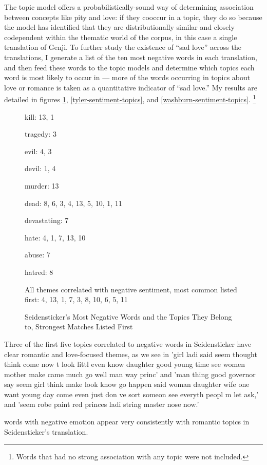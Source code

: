 \documentclass[12pt]{article}
\begin{document}
\begin{flushleft}
\begin{spacing}{2.0}
The topic model offers a probabilistically-sound way of determining association between concepts like pity and love: if they cooccur in a topic, they do so because the model has identified that they are distributionally similar and closely codependent within the thematic world of the corpus, in this case a single translation of Genji. To further study the existence of ``sad love'' across the translations, I generate a list of the ten most negative words in each translation, and then feed these words to the topic models and determine which topics each word is most likely to occur in --- more of the words occurring in topics about love or romance is taken as a quantitative indicator of ``sad love.'' My results are detailed in figures \ref{seidensticker-sentiment-topics}, \ref{tyler-sentiment-topics}, and \ref{washburn-sentiment-topics}. \footnote{Words that had no strong association with any topic were not included.} 

\begin{figure}
	\caption{Seidensticker's Most Negative Words and the Topics They Belong to, Strongest Matches Listed First}
	\label{seidensticker-sentiment-topics}
	kill: 13, 1
	
	tragedy: 3
	
	evil: 4, 3
	
	devil: 1, 4
	
	murder: 13
	
	dead: 8, 6, 3, 4, 13, 5, 10, 1, 11
	
	devastating: 7
	
	hate: 4, 1, 7, 13, 10
	
	abuse: 7
	
	hatred: 8
	
	All themes correlated with negative sentiment, most common listed first: 4, 13, 1, 7, 3, 8, 10, 6, 5, 11
\end{figure}

Three of the first five topics correlated to negative words in Seidensticker have clear romantic and love-focused themes, as we see in 'girl ladi said seem thought think come now t look littl even know daughter good young time see women mother make came much go well man way princ' and 'man thing good governor say seem girl think make look know go happen said woman daughter wife one want young day come even just don ve sort someon see everyth peopl m let ask,' and 'seem robe paint red princes ladi string master nose now.' 

words with negative emotion appear very consistently with romantic topics in Seidensticker's translation. 


\end{spacing}
\end{flushleft}
\end{document}
